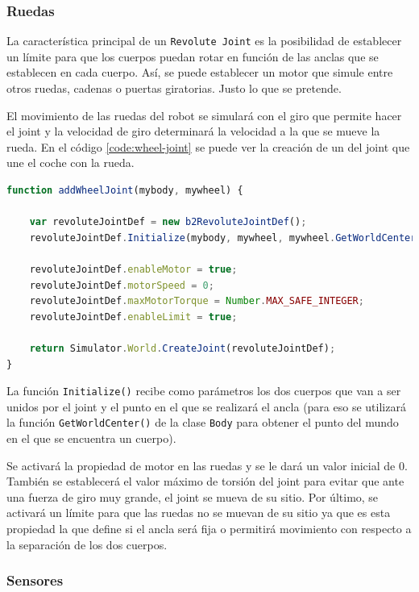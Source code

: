 \subsubsection*{Ruedas}

La característica principal de un \texttt{Revolute Joint} es la posibilidad de establecer  un límite para que los cuerpos puedan rotar en función de las anclas que se establecen en cada cuerpo. Así, se puede establecer un motor que simule entre otros ruedas, cadenas o puertas giratorias. Justo lo que se pretende.

El movimiento de las ruedas del robot se simulará con el giro que permite hacer el joint y la velocidad de giro determinará la velocidad a la que se mueve la rueda. En el código \ref{code:wheel-joint} se puede ver la creación de un del joint que une el coche con la rueda.

\begin{lstlisting}[language={Javascript},label={code:wheel-joint}, caption={Función que crea el joint que une la rueda al coche.}]
function addWheelJoint(mybody, mywheel) {

	var revoluteJointDef = new b2RevoluteJointDef();
	revoluteJointDef.Initialize(mybody, mywheel, mywheel.GetWorldCenter());

	revoluteJointDef.enableMotor = true;
	revoluteJointDef.motorSpeed = 0;
	revoluteJointDef.maxMotorTorque = Number.MAX_SAFE_INTEGER;
	revoluteJointDef.enableLimit = true;

	return Simulator.World.CreateJoint(revoluteJointDef);
}
\end{lstlisting}

La función \texttt{Initialize()} recibe como parámetros los dos cuerpos que van a ser unidos por el joint y el punto en el que se realizará el ancla (para eso se utilizará la función \texttt{GetWorldCenter()} de la clase \texttt{Body} para obtener el punto del mundo en el que se encuentra un cuerpo).

Se activará la propiedad de motor en las ruedas y se le dará un valor inicial de 0. También se establecerá el valor máximo de torsión del joint para evitar que ante una fuerza de giro muy grande, el joint se mueva de su sitio. Por último, se activará un límite para que las ruedas no se muevan de su sitio ya que es esta propiedad la que define si el ancla será fija o permitirá movimiento con respecto a la separación de los dos cuerpos.


\subsubsection*{Sensores}


